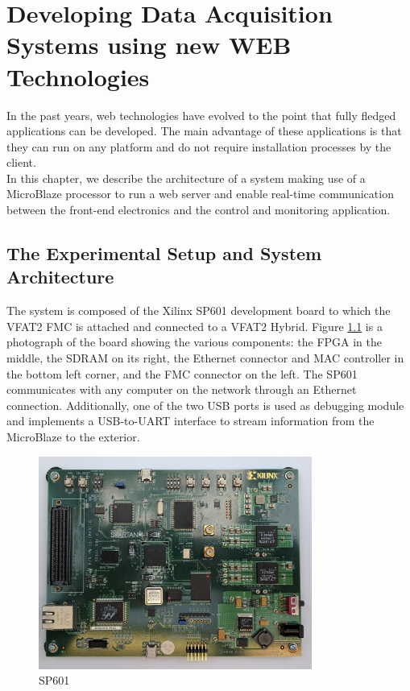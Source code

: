 \chapter{Developing Data Acquisition Systems using new WEB Technologies}
\label{chap:III-2-web-daq}

  In the past years, web technologies have evolved to the point that fully fledged applications can be developed. The main advantage of these applications is that they can run on any platform and do not require installation processes by the client. \\

  In this chapter, we describe the architecture of a system making use of a MicroBlaze processor to run a web server and enable real-time communication between the front-end electronics and the control and monitoring application.

  \section{The Experimental Setup and System Architecture}

    The system is composed of the Xilinx SP601 development board to which the VFAT2 FMC is attached and connected to a VFAT2 Hybrid. Figure \ref{fig:III-2-sp601} is a photograph of the board showing the various components: the FPGA in the middle, the SDRAM on its right, the Ethernet connector and MAC controller in the bottom left corner, and the FMC connector on the left. The SP601 communicates with any computer on the network through an Ethernet connection. Additionally, one of the two USB ports is used as debugging module and implements a USB-to-UART interface to stream information from the MicroBlaze to the exterior. \\

    \begin{figure}[h!]
      \centering
      \includegraphics[width=0.8\textwidth]{img/III-2-web-daq/sp601.jpg}
      \caption{SP601}
      \label{fig:III-2-sp601}
    \end{figure}


